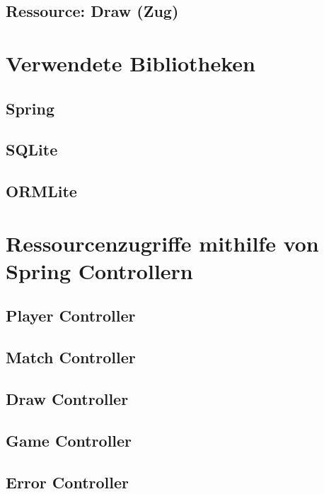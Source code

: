 \subsection{Ressource: Draw (Zug)}


\section{Verwendete Bibliotheken}
\subsection{Spring}
\subsection{SQLite}
\subsection{ORMLite}

\section{Ressourcenzugriffe mithilfe von Spring Controllern}
\subsection{Player Controller}
\subsection{Match Controller}
\subsection{Draw Controller}
\subsection{Game Controller}
\subsection{Error Controller}